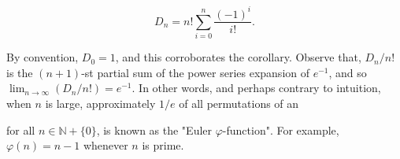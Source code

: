 $$D_n = n! \sum_{i=0}^{n} \frac{(-1)^i}{i!}.$$

By convention, $D_0 = 1$, and this corroborates the corollary. Observe that, $D_n/n!$ is the $(n+1)$-st partial sum of the power series expansion of $e^{-1}$, and so $\lim_{n \to \infty} (D_n/n!) = e^{-1}$. In other words, and perhaps contrary to intuition, when $n$ is large, approximately $1/e$ of all permutations of an

for all $n \in \mathbb{N} + \{0\}$, is known as the "Euler $\varphi$-function". For example, $\varphi(n) = n - 1$ whenever $n$ is prime.
